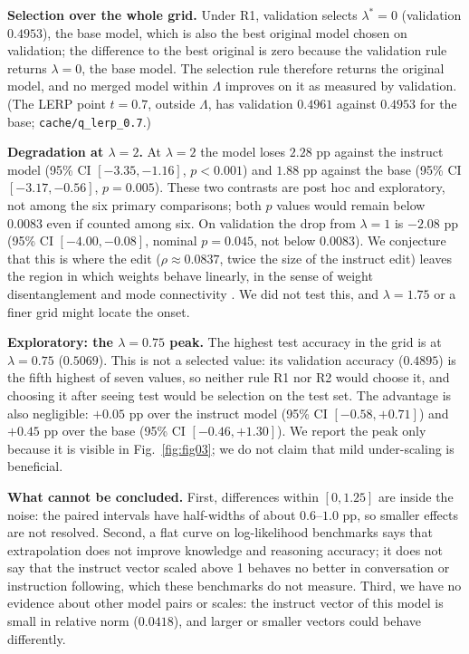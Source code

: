 \documentclass[conference]{IEEEtran}
\begin{document}
\textbf{Selection over the whole grid.} Under R1, validation selects $\lambda^\ast=0$ (validation $0.4953$), the base model, which is also the best original model chosen on validation; the difference to the best original is zero because the validation rule returns $\lambda=0$, the base model. The selection rule therefore returns the original model, and no merged model within $\Lambda$ improves on it as measured by validation. (The LERP point $t=0.7$, outside $\Lambda$, has validation $0.4961$ against $0.4953$ for the base; \texttt{cache/q\_lerp\_0.7}.)

\textbf{Degradation at $\lambda=2$.} At $\lambda=2$ the model loses $2.28$ pp against the instruct model (95\% CI $[-3.35,-1.16]$, $p<0.001$) and $1.88$ pp against the base (95\% CI $[-3.17,-0.56]$, $p=0.005$). These two contrasts are post hoc and exploratory, not among the six primary comparisons; both $p$ values would remain below $0.0083$ even if counted among six. On validation the drop from $\lambda=1$ is $-2.08$ pp (95\% CI $[-4.00,-0.08]$, nominal $p=0.045$, not below $0.0083$). We conjecture that this is where the edit ($\rho\approx0.0837$, twice the size of the instruct edit) leaves the region in which weights behave linearly, in the sense of weight disentanglement and mode connectivity \cite{ortizjimenez2023tangent,frankle2020lmc}. We did not test this, and $\lambda=1.75$ or a finer grid might locate the onset.

\textbf{Exploratory: the $\lambda=0.75$ peak.} The highest test accuracy in the grid is at $\lambda=0.75$ ($0.5069$). This is not a selected value: its validation accuracy ($0.4895$) is the fifth highest of seven values, so neither rule R1 nor R2 would choose it, and choosing it after seeing test would be selection on the test set. The advantage is also negligible: $+0.05$ pp over the instruct model (95\% CI $[-0.58,+0.71]$) and $+0.45$ pp over the base (95\% CI $[-0.46,+1.30]$). We report the peak only because it is visible in Fig.~\ref{fig:fig03}; we do not claim that mild under-scaling is beneficial.

\textbf{What cannot be concluded.} First, differences within $[0,1.25]$ are inside the noise: the paired intervals have half-widths of about $0.6$--$1.0$ pp, so smaller effects are not resolved. Second, a flat curve on log-likelihood benchmarks says that extrapolation does not improve knowledge and reasoning accuracy; it does not say that the instruct vector scaled above 1 behaves no better in conversation or instruction following, which these benchmarks do not measure. Third, we have no evidence about other model pairs or scales: the instruct vector of this model is small in relative norm ($0.0418$), and larger or smaller vectors could behave differently.
\end{document}
